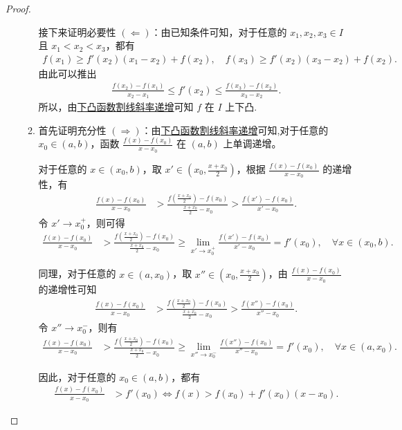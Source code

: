 \documentclass[lang=cn,newtx,10pt,scheme=chinese]{elegantbook}
\begin{document}
\begin{proof}
\begin{enumerate}
\begin{enumerate}[(1)]
接下来证明必要性 $(\Leftarrow)$：由已知条件可知，对于任意的 $x_1,x_2,x_3\in I$ 且 $x_1 < x_2 < x_3$，都有
\begin{align*}
f(x_1) \geqslant f'(x_2)(x_1 - x_2) + f(x_2),\quad f(x_3) \geqslant f'(x_2)(x_3 - x_2) + f(x_2).
\end{align*}
由此可以推出
\begin{align*}
\frac{f(x_2) - f(x_1)}{x_2 - x_1} \leqslant f'(x_2) \leqslant \frac{f(x_3) - f(x_2)}{x_3 - x_2}.
\end{align*}
所以，由\hyperref[下凸函数割线斜率递增]{下凸函数割线斜率递增}可知 $f$ 在 $I$ 上下凸.

\item 首先证明充分性 $(\Rightarrow)$：由\hyperref[下凸函数割线斜率递增]{下凸函数割线斜率递增}可知,对于任意的 $x_0\in (a,b)$，函数 $\frac{f(x) - f(x_0)}{x - x_0}$ 在 $(a,b)$ 上单调递增。

对于任意的 $x\in (x_0,b)$，取 $x'\in \left(x_0,\frac{x + x_0}{2}\right)$，根据 $\frac{f(x) - f(x_0)}{x - x_0}$ 的递增性，有
\begin{align*}
\frac{f(x) - f(x_0)}{x - x_0} &> \frac{f\left(\frac{x + x_0}{2}\right) - f(x_0)}{\frac{x + x_0}{2} - x_0} > \frac{f(x') - f(x_0)}{x' - x_0}.
\end{align*}
令 $x'\to x_0^+$，则可得
\begin{align*}
\frac{f(x) - f(x_0)}{x - x_0} &> \frac{f\left(\frac{x + x_0}{2}\right) - f(x_0)}{\frac{x + x_0}{2} - x_0} \geqslant \lim_{x'\to x_0^+}\frac{f(x') - f(x_0)}{x' - x_0}=f'(x_0),\quad \forall x\in (x_0,b).
\end{align*}

同理，对于任意的 $x\in (a,x_0)$，取 $x''\in \left(x_0,\frac{x + x_0}{2}\right)$，由 $\frac{f(x) - f(x_0)}{x - x_0}$ 的递增性可知
\begin{align*}
\frac{f(x) - f(x_0)}{x - x_0} &> \frac{f\left(\frac{x + x_0}{2}\right) - f(x_0)}{\frac{x + x_0}{2} - x_0} > \frac{f(x'') - f(x_0)}{x'' - x_0}.
\end{align*}
令 $x''\to x_0^-$，则有
\begin{align*}
\frac{f(x) - f(x_0)}{x - x_0} &> \frac{f\left(\frac{x + x_0}{2}\right) - f(x_0)}{\frac{x + x_0}{2} - x_0} \geqslant \lim_{x''\to x_0^-}\frac{f(x'') - f(x_0)}{x'' - x_0}=f'(x_0),\quad \forall x\in (a,x_0).
\end{align*}

因此，对于任意的 $x_0\in (a,b)$，都有
\begin{align*}
\frac{f(x) - f(x_0)}{x - x_0} &> f'(x_0) \Leftrightarrow f(x)>f(x_0)+f'(x_0)(x - x_0).
\end{align*}


\end{enumerate}
\end{enumerate}
\end{proof}
\end{document}
